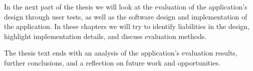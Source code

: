In the next part of the thesis we will look at the evaluation of the application's design through user tests, as well as the software design and implementation of the application. In these chapters we will try to identify liabilities in the design, highlight implementation details, and discuss evaluation methods.

The thesis text ends with an analysis of the application's evaluation results, further conclusions, and a reflection on future work and opportunities.
